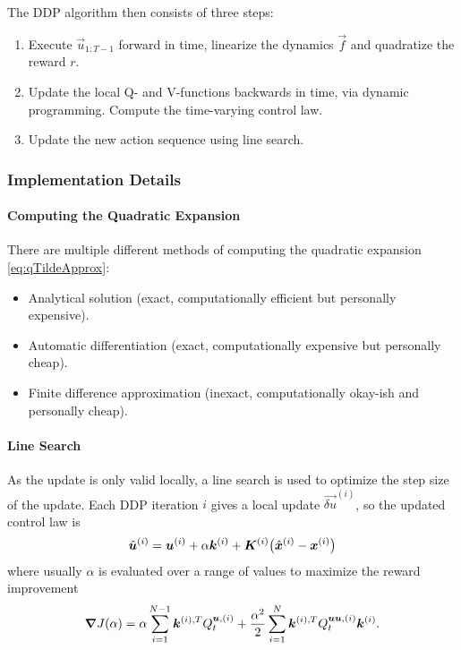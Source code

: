 			The DDP algorithm then consists of three steps:
			\begin{enumerate}
				\item Execute \( \vec{u}_{1:T - 1} \) forward in time, linearize the dynamics \(\vec{f}\) and quadratize the reward \(r\).
				\item Update the local Q- and V-functions backwards in time, via dynamic programming. Compute the time-varying control law.
				\item Update the new action sequence using line search.
			\end{enumerate}

			\subsubsection{Implementation Details}
				\paragraph{Computing the Quadratic Expansion}
					There are multiple different methods of computing the quadratic expansion \eqref{eq:qTildeApprox}:
					\begin{itemize}
						\item Analytical solution (exact, computationally efficient but personally expensive).
						\item Automatic differentiation (exact, computationally expensive but personally cheap).
						\item Finite difference approximation (inexact, computationally okay-ish and personally cheap).
					\end{itemize}

				\paragraph{Line Search}
					As the update is only valid locally, a line search is used to optimize the step size of the update. Each DDP iteration \(i\) gives a local update \( \vec{\delta u}^{(i)} \), so the updated control law is
					\begin{equation*}
						\hat{\bm{u}}^{(i)} = \bm{u}^{(i)} + \alpha \bm{k}^{(i)} + \bm{K}^{(i)} \big( \hat{\bm{x}}^{(i)} - \bm{x}^{(i)} \big) \\
					\end{equation*}
					where usually \(\alpha\) is evaluated over a range of values to maximize the reward improvement
					\begin{equation*}
						\grad{J(\alpha)} = \alpha \sum_{i = 1}^{N - 1} \bm{k}^{(i), T} Q_t^{\bm{u}, (i)} + \frac{\alpha^2}{2} \sum_{i = 1}^{N} \bm{k}^{(i), T} Q_t^{\bm{u} \bm{u}, (i)} \bm{k}^{(i)}.
					\end{equation*}

